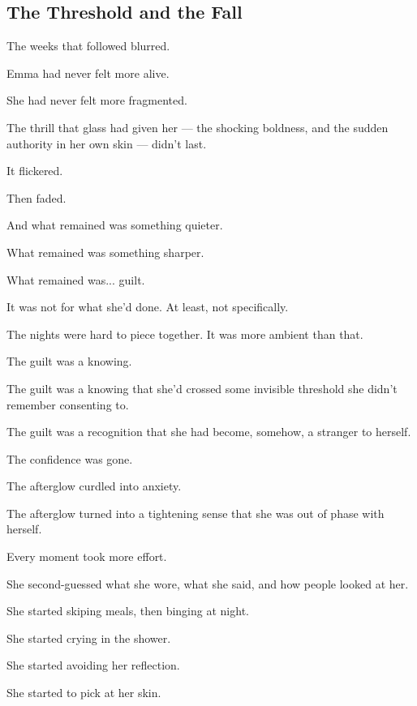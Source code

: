 
\subsection{The Threshold and the Fall}

The weeks that followed blurred.

Emma had never felt more alive.

She had never felt more fragmented. 

The thrill that glass had given her --- the shocking 
boldness, and the sudden authority in her own skin --- didn’t last.  

It flickered. 

Then faded. 

And what remained was something quieter. 

What remained was something sharper.

What remained was... guilt.

It was not for what she’d done. At least, not specifically. 

The nights were hard to piece together. 
It was more ambient than that. 

The guilt was a knowing. 

The guilt was a knowing that she'd crossed some invisible threshold she didn’t 
remember consenting to. 

The guilt was a recognition that she had become, somehow, a stranger to herself.

The confidence was gone.

The afterglow curdled into anxiety. 

The afterglow turned into a tightening sense that she was 
out of phase with herself. 

Every moment took more effort. 

She second-guessed what she wore, what she said, and how people looked at her. 

She started skiping meals, then binging at night. 

She started crying in the shower. 

She started avoiding her reflection. 

She started to pick at her skin. 

\medskip

